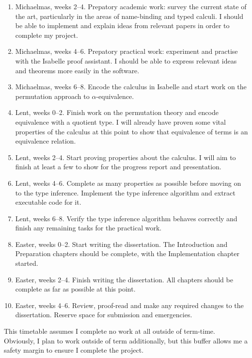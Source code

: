 \documentclass[12pt]{article}
\begin{document}
\begin{enumerate}
\item
Michaelmas, weeks 2--4.
Prepatory academic work: survey the current state of the art, particularly in the areas of name-binding and typed calculi.
I should be able to implement and explain ideas from relevant papers in order to complete my project.
\item
Michaelmas, weeks 4--6.
Prepatory practical work: experiment and practise with the Isabelle proof assistant.
I should be able to express relevant ideas and theorems more easily in the software.
\item
Michaelmas, weeks 6--8.
Encode the calculus in Isabelle and start work on the permutation approach to \(\alpha\)-equivalence.
\item
Lent, weeks 0--2.
Finish work on the permutation theory and encode equivalence with a quotient type.
I will already have proven some vital properties of the calculus at this point to show that equivalence of terms is an equivalence relation.
\item
Lent, weeks 2--4.
Start proving properties about the calculus.
I will aim to finish at least a few to show for the progress report and presentation.
\item
Lent, weeks 4--6.
Complete as many properties as possible before moving on to the type inference.
Implement the type inference algorithm and extract executable code for it.
\item
Lent, weeks 6--8.
Verify the type inference algorithm behaves correctly and finish any remaining tasks for the practical work.
\item
Easter, weeks 0--2.
Start writing the dissertation.
The Introduction and Preparation chapters should be complete, with the Implementation chapter started.
\item
Easter, weeks 2--4.
Finish writing the dissertation.
All chapters should be complete as far as possible at this point.
\item
Easter, weeks 4--6.
Review, proof-read and make any required changes to the dissertation.
Reserve space for submission and emergencies.
\end{enumerate}

This timetable assumes I complete no work at all outside of term-time. 
Obviously, I plan to work outside of term additionally, but this buffer allows me a safety margin to ensure I complete the project.
\printbibliography
\end{document}
